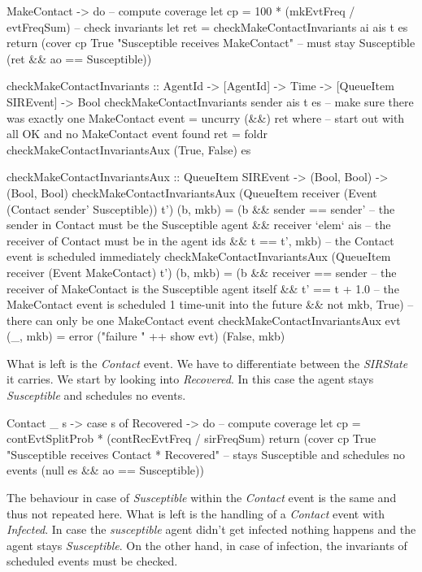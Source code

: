 \begin{HaskellCode}
MakeContact -> do
  -- compute coverage
  let cp  = 100 * (mkEvtFreq / evtFreqSum)
  -- check invariants
  let ret = checkMakeContactInvariants ai ais t es
  return (cover cp True "Susceptible receives MakeContact" 
         -- must stay Susceptible 
         (ret && ao == Susceptible))

checkMakeContactInvariants :: AgentId -> [AgentId] -> Time -> [QueueItem SIREvent] -> Bool
checkMakeContactInvariants sender ais t es 
    -- make sure there was exactly one MakeContact event
    = uncurry (&&) ret
  where
    -- start out with all OK and no MakeContact event found
    ret = foldr checkMakeContactInvariantsAux (True, False) es

    checkMakeContactInvariantsAux :: QueueItem SIREvent -> (Bool, Bool) -> (Bool, Bool)
    checkMakeContactInvariantsAux 
        (QueueItem receiver (Event (Contact sender' Susceptible)) t') (b, mkb)
      = (b && sender == sender'    -- the sender in Contact must be the Susceptible agent
           && receiver `elem` ais  -- the receiver of Contact must be in the agent ids
           && t == t', mkb)        -- the Contact event is scheduled immediately
    checkMakeContactInvariantsAux 
        (QueueItem receiver (Event MakeContact) t') (b, mkb) 
      = (b && receiver == sender  -- the receiver of MakeContact is the Susceptible agent itself
           && t' == t + 1.0       -- the MakeContact event is scheduled 1 time-unit into the future
           && not mkb, True)      -- there can only be one MakeContact event
    checkMakeContactInvariantsAux evt (_, mkb) = error ("failure " ++ show evt) (False, mkb)
\end{HaskellCode}

What is left is the \textit{Contact} event. We have to differentiate between the \textit{SIRState} it carries. We start by looking into \textit{Recovered}. In this case the agent stays \textit{Susceptible} and schedules no events. 

\begin{HaskellCode}
Contact _ s -> 
  case s of
    Recovered -> do
      -- compute coverage
      let cp = contEvtSplitProb * (contRecEvtFreq / sirFreqSum)
      return (cover cp True "Susceptible receives Contact * Recovered"
              -- stays Susceptible and schedules no events
              (null es && ao == Susceptible))
\end{HaskellCode}

The behaviour in case of \textit{Susceptible} within the \textit{Contact} event is the same and thus not repeated here. What is left is the handling of a \textit{Contact} event with \textit{Infected}. In case the \textit{susceptible} agent didn't get infected nothing happens and the agent stays \textit{Susceptible}. On the other hand, in case of infection, the invariants of scheduled events must be checked.


